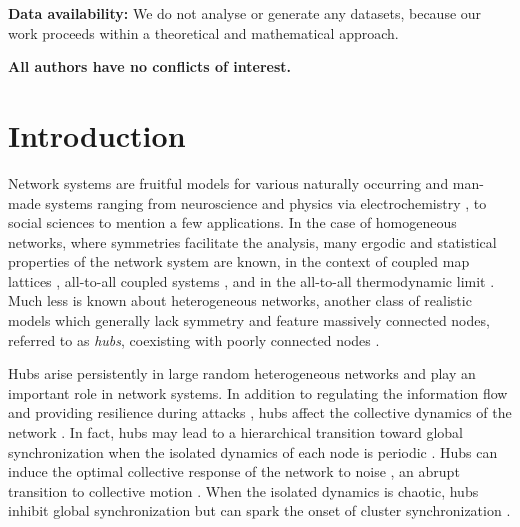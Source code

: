 \documentclass[a4paper]{article}
\theoremstyle{plain}
\theoremstyle{definition}
\begin{document}

\tableofcontents

\vspace{1cm}
\textbf{Data availability:} We do not analyse or generate any datasets, because our work proceeds within a theoretical and mathematical approach.

\textbf{All authors have no conflicts of interest.}


\newpage
\section{Introduction}
Network systems are fruitful models for various naturally occurring and man-made systems ranging from neuroscience \cite{HubScience} and physics \cite{marvel2009invariant} via electrochemistry \cite{nijholt2022emergent}, to social sciences  \cite{RMP} to mention a few applications. In the case of homogeneous networks, where %
symmetries facilitate the analysis, many ergodic and statistical properties of the network system are known, in the context of coupled map lattices \cite{chazottes2005dynamics}, all-to-all coupled systems \cite{Fernandez2019,Bahsoun2023-anosov}, and in the all-to-all thermodynamic limit \cite{ST2021-LR-SCTO,ST2022-sync, Galatolo2022}. Much less is known about heterogeneous networks, another class of realistic models which generally lack symmetry and feature massively connected nodes, referred to as \textit{hubs}, coexisting with poorly connected nodes \cite{judd2013exactly}. 

Hubs arise persistently in large random heterogeneous networks \cite{Banerjee2021} and play an important role in network systems. In addition to regulating the information flow and providing resilience during attacks \cite{albert2002statistical}, hubs affect the collective dynamics of the network  \cite{HubScience}. In fact, hubs may lead to a hierarchical transition toward global synchronization when the isolated dynamics of each node is periodic \cite{gomez2007paths}. Hubs can induce the optimal collective response of the network to noise \cite{tonjes2021coherence}, an abrupt transition to collective motion \cite{vlasov2015explosive}. When the isolated dynamics is chaotic, hubs inhibit global synchronization \cite{PvST20} but can spark the onset of cluster synchronization \cite{corder2023emergence,montalban2024spark}.
\end{document}

